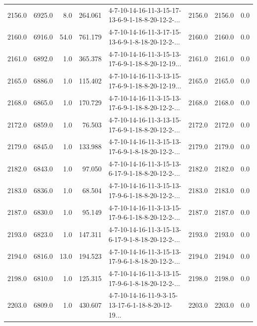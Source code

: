\begin{tabular}{rrrrlrrr}
 2156.0 &  6925.0 &            8.0 &            264.061 &  4-7-10-14-16-11-3-15-17-13-6-9-1-18-8-20-12-2-... &        2156.0 &          2156.0 &       0.0 \\
 2160.0 &  6916.0 &           54.0 &            761.179 &  4-7-10-14-16-11-3-17-15-13-6-9-1-8-18-20-12-2-... &        2160.0 &          2160.0 &       0.0 \\
 2161.0 &  6892.0 &            1.0 &            365.378 &  4-7-10-14-16-11-3-15-13-17-6-9-1-18-8-20-12-19... &        2161.0 &          2161.0 &       0.0 \\
 2165.0 &  6886.0 &            1.0 &            115.402 &  4-7-10-14-16-11-3-13-15-17-6-9-1-18-8-20-12-19... &        2165.0 &          2165.0 &       0.0 \\
 2168.0 &  6865.0 &            1.0 &            170.729 &  4-7-10-14-16-11-3-15-13-17-6-9-1-18-8-20-12-2-... &        2168.0 &          2168.0 &       0.0 \\
 2172.0 &  6859.0 &            1.0 &             76.503 &  4-7-10-14-16-11-3-13-15-17-6-9-1-18-8-20-12-2-... &        2172.0 &          2172.0 &       0.0 \\
 2179.0 &  6845.0 &            1.0 &            133.988 &  4-7-10-14-16-11-3-15-13-17-6-9-1-8-18-20-12-2-... &        2179.0 &          2179.0 &       0.0 \\
 2182.0 &  6843.0 &            1.0 &             97.050 &  4-7-10-14-16-11-3-15-13-6-17-9-1-18-8-20-12-2-... &        2182.0 &          2182.0 &       0.0 \\
 2183.0 &  6836.0 &            1.0 &             68.504 &  4-7-10-14-16-11-3-15-13-17-9-6-1-18-8-20-12-2-... &        2183.0 &          2183.0 &       0.0 \\
 2187.0 &  6830.0 &            1.0 &             95.149 &  4-7-10-14-16-11-3-13-15-17-9-6-1-18-8-20-12-2-... &        2187.0 &          2187.0 &       0.0 \\
 2193.0 &  6823.0 &            1.0 &            147.311 &  4-7-10-14-16-11-3-15-13-6-17-9-1-8-18-20-12-2-... &        2193.0 &          2193.0 &       0.0 \\
 2194.0 &  6816.0 &           13.0 &            194.523 &  4-7-10-14-16-11-3-15-13-17-9-6-1-8-18-20-12-2-... &        2194.0 &          2194.0 &       0.0 \\
 2198.0 &  6810.0 &            1.0 &            125.315 &  4-7-10-14-16-11-3-13-15-17-9-6-1-8-18-20-12-2-... &        2198.0 &          2198.0 &       0.0 \\
 2203.0 &  6809.0 &            1.0 &            430.607 &  4-7-10-14-16-11-9-3-15-13-17-6-1-18-8-20-12-19... &        2203.0 &          2203.0 &       0.0 \\
\bottomrule
\end{tabular}
